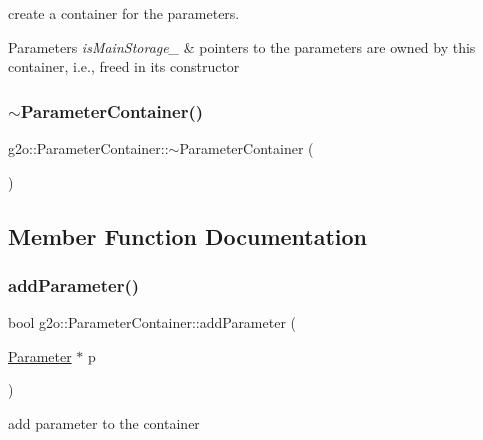 create a container for the parameters. 
\begin{DoxyParams}{Parameters}
{\em is\+Main\+Storage\+\_\+} & pointers to the parameters are owned by this container, i.\+e., freed in its constructor \\
\hline
\end{DoxyParams}
\mbox{\label{classg2o_1_1_parameter_container_a186660e1ef0350798a549b247365b295}} 
\subsubsection{\texorpdfstring{$\sim$\+Parameter\+Container()}{~ParameterContainer()}}
{\footnotesize\ttfamily g2o\+::\+Parameter\+Container\+::$\sim$\+Parameter\+Container (\begin{DoxyParamCaption}{ }\end{DoxyParamCaption})\hspace{0.3cm}{\ttfamily [virtual]}}



\subsection{Member Function Documentation}
\mbox{\label{classg2o_1_1_parameter_container_a9c0b1376e780b177f2d36c4ee4f873d7}} 
\subsubsection{\texorpdfstring{add\+Parameter()}{addParameter()}}
{\footnotesize\ttfamily bool g2o\+::\+Parameter\+Container\+::add\+Parameter (\begin{DoxyParamCaption}\item[{\mbox{\hyperlink{classg2o_1_1_parameter}{Parameter}} $\ast$}]{p }\end{DoxyParamCaption})}



add parameter to the container 

